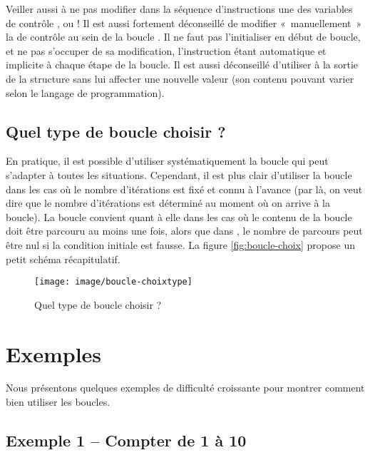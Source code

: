 		Veiller aussi à ne pas modifier dans la séquence d’instructions une des
		variables de contrôle ,  ou  ! Il
		est aussi fortement déconseillé de modifier «~manuellement~» la
		 de contrôle au sein de la boucle
		. Il ne faut pas l’initialiser en début de boucle,
		et ne pas s’occuper de sa modification, l’instruction 
		étant automatique et implicite à chaque étape de la
		boucle. Il est aussi déconseillé d’utiliser  à la
		sortie de la structure  sans lui affecter une
		nouvelle valeur (son contenu pouvant varier selon le langage de
		programmation).

	\subsection{Quel type de boucle choisir ?}

		En pratique, il est possible d’utiliser systématiquement la boucle 
		 qui peut s’adapter à toutes les situations. 
		Cependant, il est plus clair d’utiliser la boucle  
		dans les cas où le nombre d’itérations est fixé et connu à l’avance 
		(par là, on veut dire que le nombre d'itérations est déterminé au moment 
		où on arrive à la boucle). 
		La boucle  convient quant à elle
		dans les cas où le contenu de la boucle doit être parcouru au moins une
		fois, alors que dans , 
		le nombre de parcours peut être nul si la condition initiale est fausse. 
		La figure \vref{fig:boucle-choix} propose un petit schéma récapitulatif.

		\begin{figure}[h]
		\centering
		\texttt{[image: image/boucle-choixtype]}
		\caption{Quel type de boucle choisir ?}
		\label{fig:boucle-choix}
		\end{figure}

\section{Exemples}

	Nous présentons quelques exemples de difficulté
	croissante pour montrer comment bien utiliser les boucles.

	\subsection{Exemple 1 -- Compter de 1 à 10}

